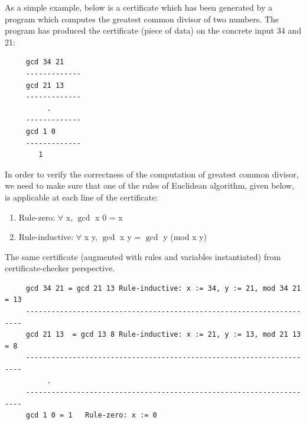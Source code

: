  
  
   \noindent 
    As a simple example, below is a certificate which has been generated by a program which computes the greatest common divisor 
    of two numbers. The program has produced the certificate (piece of data)
    on the concrete input 34 and 21:
    \begin{center}
  
   \begin{verbatim}
     gcd 34 21
     -------------
     gcd 21 13
     -------------
          .
     -------------
     gcd 1 0 
     -------------
        1
   \end{verbatim}
    \end{center}
   
   
   In order to verify the correctness of the computation of greatest common divisor, we need to 
    make sure that one of the rules of Euclidean algorithm, given below, is applicable at 
    each line of the certificate:
   \begin{enumerate}
   \item Rule-zero: $\forall$ x, $\gcd$ x 0 = x
   \item Rule-inductive: $\forall$ x y, $\gcd$ x y = $\gcd$ y (mod x y)
   \end{enumerate}

 \noindent	
  The same certificate (augmented with rules and variables instantiated) from certificate-checker perspective.
    \begin{verbatim}
     gcd 34 21 = gcd 21 13 Rule-inductive: x := 34, y := 21, mod 34 21 = 13
     ---------------------------------------------------------------------
     gcd 21 13  = gcd 13 8 Rule-inductive: x := 21, y := 13, mod 21 13 = 8
     ---------------------------------------------------------------------
          .
     ---------------------------------------------------------------------
     gcd 1 0 = 1   Rule-zero: x := 0 
   \end{verbatim}
   
